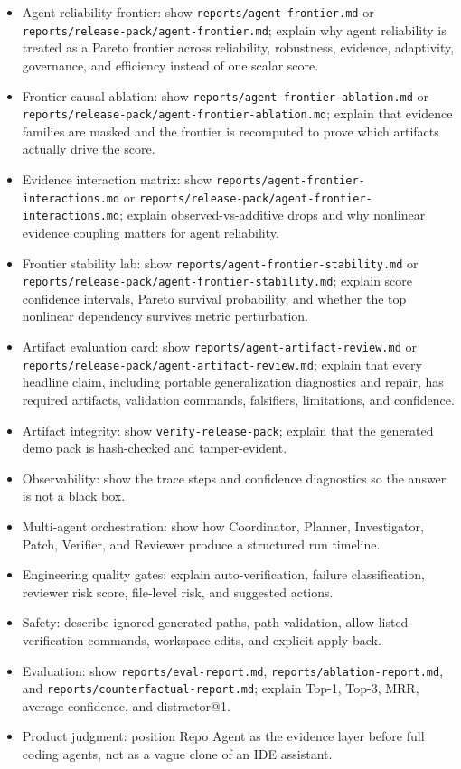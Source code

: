 \documentclass[UTF8,12pt,openany]{ctexbook}
\begin{document}
\begin{itemize}
\item Agent reliability frontier: show \texttt{reports/agent-frontier.md} or \texttt{reports/release-pack/agent-frontier.md}; explain why agent reliability is treated as a Pareto frontier across reliability, robustness, evidence, adaptivity, governance, and efficiency instead of one scalar score.
\item Frontier causal ablation: show \texttt{reports/agent-frontier-ablation.md} or \texttt{reports/release-pack/agent-frontier-ablation.md}; explain that evidence families are masked and the frontier is recomputed to prove which artifacts actually drive the score.
\item Evidence interaction matrix: show \texttt{reports/agent-frontier-interactions.md} or \texttt{reports/release-pack/agent-frontier-interactions.md}; explain observed-vs-additive drops and why nonlinear evidence coupling matters for agent reliability.
\item Frontier stability lab: show \texttt{reports/agent-frontier-stability.md} or \texttt{reports/release-pack/agent-frontier-stability.md}; explain score confidence intervals, Pareto survival probability, and whether the top nonlinear dependency survives metric perturbation.
\item Artifact evaluation card: show \texttt{reports/agent-artifact-review.md} or \texttt{reports/release-pack/agent-artifact-review.md}; explain that every headline claim, including portable generalization diagnostics and repair, has required artifacts, validation commands, falsifiers, limitations, and confidence.
\item Artifact integrity: show \texttt{verify-release-pack}; explain that the generated demo pack is hash-checked and tamper-evident.
\item Observability: show the trace steps and confidence diagnostics so the answer is not a black box.
\item Multi-agent orchestration: show how Coordinator, Planner, Investigator, Patch, Verifier, and Reviewer produce a structured run timeline.
\item Engineering quality gates: explain auto-verification, failure classification, reviewer risk score, file-level risk, and suggested actions.
\item Safety: describe ignored generated paths, path validation, allow-listed verification commands, workspace edits, and explicit apply-back.
\item Evaluation: show \texttt{reports/eval-report.md}, \texttt{reports/ablation-report.md}, and \texttt{reports/counterfactual-report.md}; explain Top-1, Top-3, MRR, average confidence, and distractor@1.
\item Product judgment: position Repo Agent as the evidence layer before full coding agents, not as a vague clone of an IDE assistant.
\end{itemize}
\end{document}
